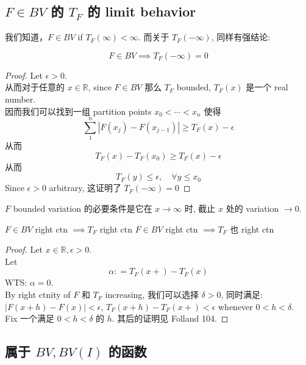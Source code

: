 \documentclass[lang=cn,11pt]{elegantbook}
\begin{document}
\subsection{$F\in BV$ 的 $T_F$ 的 limit behavior}

我们知道，$F\in BV$ if $T_F(\infty) < \infty$. 而关于 $ T_F(-\infty)$, 同样有强结论:
\begin{proposition} \[
F \in BV \implies T_F(-\infty)  = 0
\]
\end{proposition}
\begin{proof}
    Let $\epsilon  > 0$.\\
    从而对于任意的 $x \in \mathbb{R}$, since $F\in BV$ 那么 $T_F$ bounded, $T_F(x)$ 是一个 real number.\\
    因而我们可以找到一组 partition points $x_0 < \cdots < x_n$ 使得 \[
    \sum_{1}^n |F(x_j)- F(x_{j-1})| \geq T_F(x) - \epsilon
    \]从而 \[
    T_F(x) - T_F(x_0) \geq T_F(x) - \epsilon
    \]从而 \[
    T_F(y) \leq \epsilon,\quad \forall y\leq x_0
    \]
Since $\epsilon  > 0$ arbitrary, 这证明了 $T_F(-\infty) = 0$
\end{proof}
\begin{remark}
$F$ bounded variation 的必要条件是它在 $x \to \infty$ 时, 截止 $x$ 处的 variation $\to 0$. 
\end{remark}


\begin{lemma}{$F\in BV$ right ctn $\implies T_F$ right ctn}
$F\in BV$ right ctn $\implies T_F$ 也 right ctn
\end{lemma}
\begin{proof}
Let $x\in \mathbb{R}, \epsilon > 0$.\\
Let \[
\alpha : = T_F(x+) - T_F(x)
\]WTS: $\alpha = 0$.\\
By right ctnity of $F$ 和 $T_F$ increasing, 我们可以选择 $\delta > 0$, 同时满足: $|F(x+ h) - F(x)|<\epsilon$, $T_F(x+h) - T_F(x+) < \epsilon$ whenever $0<h<\delta$.\\
Fix 一个满足 $0<h<\delta$ 的 $h$. 其后的证明见 Folland 104.
\end{proof}




\subsection{属于 $BV,BV(I)$ 的函数 }
\end{document}
